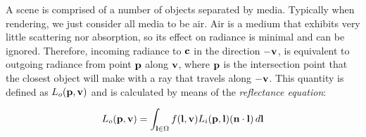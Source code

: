A scene is comprised of a number of objects separated by media. Typically when rendering, we just consider all media to be air. Air is a medium that exhibits very little scattering nor absorption, so its effect on radiance is minimal and can be ignored. Therefore, incoming radiance to \begin{math}\mathbf{c}\end{math} in the direction \begin{math}\mathbf{-v}\end{math}, is equivalent to outgoing radiance from point \begin{math}\mathbf{p}\end{math} along \begin{math}\mathbf{v}\end{math}, where \begin{math}\mathbf{p}\end{math} is the intersection point that the closest object will make with a ray that travels along \begin{math}\mathbf{-v}\end{math}. This quantity is defined as \begin{math}L_o(\mathbf{p}, \mathbf{v})\end{math} and is calculated by means of the \textit{reflectance equation}:

\begin{center}
	\[L_o(\mathbf{p}, \mathbf{v}) = \int_{\mathbf{l}\in\Omega}f(\mathbf{l}, \mathbf{v})L_i(\mathbf{p}, \mathbf{l})(\mathbf{n}\cdot\mathbf{l})\,d\mathbf{l}\]
\end{center}

